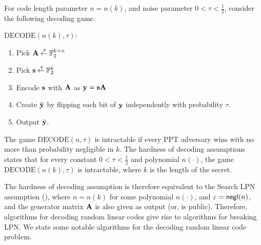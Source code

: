 For code length parameter $n = n(k)$, and noise parameter $0 < \tau < \frac{1}{2}$, consider the following decoding game.
\begin{boxedalgo}
	$\mathrm{DECODE}(n(k),\tau)$:
	\begin{enumerate}
		\item Pick ${\mathbf A} \mathbin{\stackrel{\mbox{\,\tiny \$}}{\gets}} {\mathbb F}_2^{k\times n}$
		\item Pick ${\mathbf s} \mathbin{\stackrel{\mbox{\,\tiny \$}}{\gets}} {\mathbb F}_2^k$
		\item Encode ${\mathbf s}$ with ${\mathbf A}$ as ${\mathbf y} = {\mathbf s}{\mathbf A}$
		\item Create $\hat{{\mathbf y}}$ by flipping each bit of ${\mathbf y}$ independently with probability $\tau$.
		\item Output $\hat{{\mathbf y}}$.
	\end{enumerate}
\end{boxedalgo}
The game $\mathrm{DECODE}(n,\tau)$ is intractable if every PPT adversary wins with no more than probability negligible in $k$.
The hardness of decoding assumptions states that for every constant $0 < \tau < \frac{1}{2}$ and polynomial $n(\cdot)$, the game $\mathrm{DECODE}(n(k),\tau)$ is intractable, where $k$ is the length of the secret.

The hardness of decoding assumption is therefore equivalent to the Search LPN assumption (), where $n = n(k)$ for some polynomial $n(\cdot)$, and $\varepsilon = \mathsf{negl}(n)$, and the generator matrix ${\mathbf A}$ is also given as output (or, is public).
Therefore, algorithms for decoding random linear codes give rise to algorithms for breaking LPN.
We state some notable algorithms for the decoding random linear code problem.


